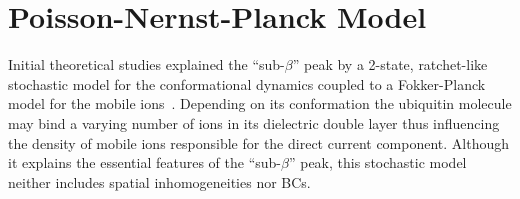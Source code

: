 \documentclass[runningheads]{lncse}
\begin{document}
\section{Poisson-Nernst-Planck Model}


Initial theoretical studies
explained the ``sub-$\beta$'' peak by a 
2-state, ratchet-like stochastic model for the conformational dynamics coupled to a Fokker-Planck model for the mobile ions~\cite[supplementary material]{BanAngewChemIE2011}.
%
Depending on its conformation the ubiquitin molecule may bind a varying number of ions in its dielectric double layer thus influencing the density of mobile ions responsible for the direct current component.
%
Although it explains the essential features
of the ``sub-$\beta$'' peak, this stochastic model neither includes spatial inhomogeneities nor BCs.
\end{document}

